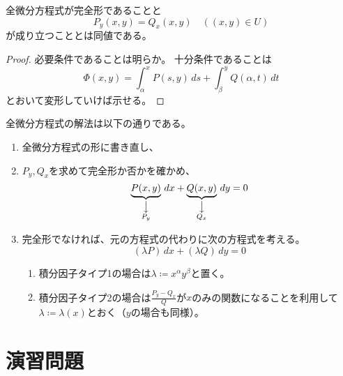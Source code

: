 \documentclass[report]{jlreq}
\begin{document}
\begin{theorem}[2.4.1]
    全微分方程式が完全形であることと
    \begin{equation}
        P_y(x, y) = Q_x(x, y) \quad ((x, y) \in U)
    \end{equation}
    が成り立つこととは同値である。
\end{theorem}

\begin{proof}
    必要条件であることは明らか。
    十分条件であることは
    \begin{equation}
        \Phi(x, y) = \int_\alpha^x P(s, y)\, ds + \int_\beta^y Q(\alpha, t)\, dt
    \end{equation}
    とおいて変形していけば示せる。
\end{proof}

全微分方程式の解法は以下の通りである。

\begin{enumerate}
    \item 全微分方程式の形に書き直し、
    \item $P_y, Q_x$を求めて完全形か否かを確かめ、
        \begin{equation}
            \underbrace{P(x, y)}_{\substack{\big\downarrow \\ P_y}}\, dx
                + \underbrace{Q(x, y)}_{\substack{\big\downarrow \\ Q_x}}\, dy = 0
        \end{equation}
    \item 完全形でなければ、元の方程式の代わりに次の方程式を考える。
        \begin{equation}
            (\lambda P)\, dx + (\lambda Q)\, dy = 0
        \end{equation}
        \begin{enumerate}
            \item 積分因子タイプ1の場合は$\lambda \coloneqq x^\alpha y^\beta$と置く。
            \item 積分因子タイプ2の場合は$\frac{P_y - Q_x}{Q}$が$x$のみの関数になることを利用して
                $\lambda \coloneqq \lambda(x)$とおく（$y$の場合も同様）。
        \end{enumerate}
\end{enumerate}


%
\newpage
\section{演習問題}
\end{document}
